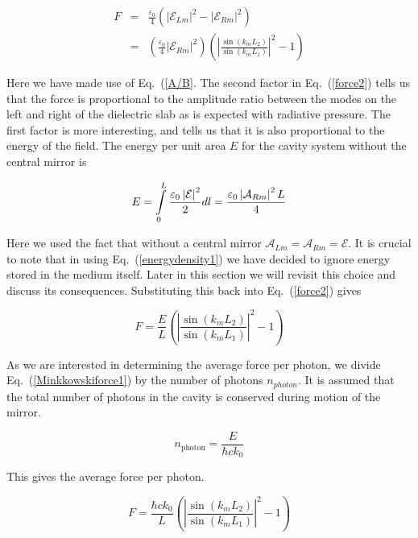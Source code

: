 \documentclass[twocolumn,english,pra,aps,superscriptaddress,floatfix]{revtex4-1}
\begin{document}
\begin{eqnarray}
F&=&\frac{\varepsilon_{0}}{4}\left(\left|\mathcal{E}_{Lm}\right|^{2}-\left|\mathcal{E}_{Rm}\right|^{2}\right)\nonumber \\ &=&\left(\frac{\varepsilon_{0}}{4}\left|\mathcal{E}_{Rm}\right|^{2}\right)\left(\left|\frac{\sin(k_{m}L_{2})}{\sin(k_{m}L_{1})}\right|^{2}-1\right)
\label{force2}
\end{eqnarray}

Here we have made use of Eq.\ (\ref{A/B}. The second factor in Eq.\ (\ref{force2}) tells us that the force is proportional to the amplitude ratio between the modes on the left and right of the dielectric slab as is expected with radiative pressure. The first factor is more interesting, and tells us that it is also proportional to the energy of the field. The energy per unit area $E$ for the cavity system without the central mirror is

\begin{equation}
E=\intop_{0}^{L}\frac{\varepsilon_{0}\left|\mathcal{E}\right|^{2}}{2}dl=\frac{\varepsilon_{0}\left|\mathcal{A}_{Rm}\right|^{2}L}{4}
\label{energydensity1}
\end{equation}
 
Here we used the fact that without a central mirror $\mathcal{A}_{Lm}=\mathcal{A}_{Rm}=\mathcal{E}$. It is crucial to note that in using Eq.\ (\ref{energydensity1}) we have decided to ignore energy stored in the medium itself.  Later in this section we will revisit this choice and discuss its consequences.  
Substituting this back into Eq.\ (\ref{force2}) gives

\begin{equation}
F=\frac{E}{L}\left(\left|\frac{\sin(k_{m}L_{2})}{\sin(k_{m}L_{1})}\right|^{2}-1\right)
\label{Minkkowskiforce1}
\end{equation}

As we are interested in determining the average force per photon, we divide Eq.\ (\ref{Minkkowskiforce1}) by the number of photons $n_{photon}$.  It is assumed that the total number of photons in the cavity is conserved during motion of the mirror.  

\begin{equation}
n_{\mathrm{photon}}=\frac{E}{\hbar ck_0}
\label{photonnumber}
\end{equation}

This gives the average force per photon.

\begin{equation}
F=\frac{\hbar ck_0}{L}\left(\left|\frac{\sin(k_{m}L_{2})}{\sin(k_{m}L_{1})}\right|^{2}-1\right)
\label{Minkowskiforce2}
\end{equation}
\end{document}
